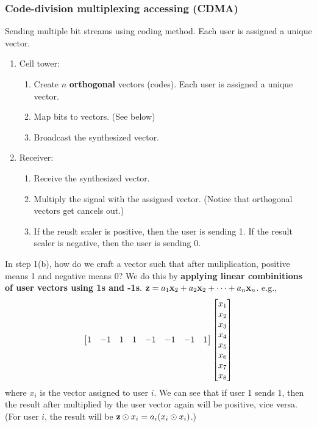 \documentclass{../../ainote}
\begin{document}
\subsubsection{Code-division multiplexing accessing (CDMA)}
Sending multiple bit streams using coding method. Each user is assigned a unique vector. 
\begin{enumerate}[leftmargin=*]
    \item Cell tower: 
        \begin{enumerate}
            \item Create $n$ \textbf{orthogonal} vectors (codes). Each user is assigned a unique vector.
            \item Map bits to vectors. (See below)
            \item Broadcast the synthesized vector.
        \end{enumerate}
    \item Receiver:
        \begin{enumerate}
            \item Receive the synthesized vector.
            \item Multiply the signal with the assigned vector. (Notice that orthogonal vectors get cancels out.)
            \item If the reuslt scaler is positive, then the user is sending 1. If the result scaler is negative, then the user is sending 0.
        \end{enumerate}
\end{enumerate}

In step 1(b), how do we craft a vector such that after muliplication, positive means 1 and negative means 0? We do this by \textbf{applying linear combinitions of user vectors using 1s and -1s}. $\mathbf{z} = a_1\mathbf{x}_2+a_2\mathbf{x}_2+\cdots+a_n\mathbf{x}_n$. e.g.,
\begin{equation*}
    \begin{bmatrix} 1 & -1 & 1 & 1 & -1 & -1 & -1 & 1 \end{bmatrix} \begin{bmatrix} x_1\\x_2\\x_3\\x_4\\x_5\\x_6\\x_7\\x_8 \end{bmatrix}
\end{equation*}
where $x_i$ is the vector assigned to user $i$. We can see that if user 1 sends 1, then the result after multiplied by the user vector again will be positive, vice versa. (For user $i$, the result will be $\mathbf{z} \odot x_i=a_i(x_i\odot x_i)$.)
\end{document}
